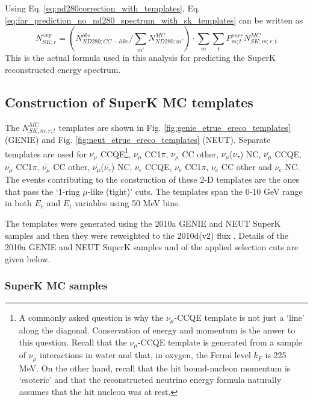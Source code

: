 Using Eq. \ref{eq:nd280correction_with_templates}, 
Eq. \ref{eq:far_prediction_no_nd280_spectrum_with_sk_templates} can be written as
\begin{equation}
\displaystyle
  N_{SK;r}^{exp} = 
    (N^{obs}_{ND280;CC-like} /
     \sum_{m\prime} N^{MC}_{ND280;m\prime})
    \cdot 
    \sum_{m} \sum_{t} 
    	P_{m;t}^{surv}
	N_{SK;m;r;t}^{MC}
\label{eq:far_prediction_no_nd280_spectrum_final}
\end{equation}
This is the actual formula used in this analysis for predicting the 
SuperK reconstructed energy spectrum.

\subsection{Construction of SuperK MC templates}
\label{sk_templates}

The $N_{SK;m;r;t}^{MC}$ templates are shown in Fig. \ref{fig:genie_etrue_ereco_templates} (GENIE) 
and Fig. \ref{fig:neut_etrue_ereco_templates} (NEUT). Separate templates are used for
$\nu_{\mu}$ CCQE\footnote{
  A commonly asked question is why the $\nu_{\mu}$-CCQE template is not just a `line' along
  the diagonal. Conservation of energy and momentum is the anwer to this question.
  Recall that the $\nu_{\mu}$-CCQE template is generated from a sample of $\nu_{\mu}$ interactions
  in water and that, in oxygen, the Fermi level $k_{F}$ is 225 MeV.
  On the other hand, recall that the hit bound-nucleon momentum is `esoteric' 
  and that the reconstructed neutrino energy formula naturally assumes that the hit nucleon was at rest.
}, 
$\nu_{\mu}$ CC1$\pi$, 
$\nu_{\mu}$ CC other, 
$\nu_{\mu}$($\nu_{\tau}$) NC, 
$\bar{\nu_{\mu}}$ CCQE, 
$\bar{\nu_{\mu}}$ CC1$\pi$, 
$\bar{\nu_{\mu}}$ CC other, 
$\bar{\nu_{\mu}}$($\bar{\nu_{\tau}}$) NC, 
$\nu_{e}$ CCQE, 
$\nu_{e}$ CC1$\pi$,
$\nu_{e}$ CC other and 
$\nu_{e}$ NC.
The events contributing to the construction of these 2-D templates are the ones that
pass the `1-ring $\mu$-like (tight)' cuts. The templates span the 0-10 GeV range in
both $E_{r}$ and $E_{t}$ variables using 50 MeV bins.

The templates were generated using the 2010a GENIE and NEUT SuperK samples and
then they were reweighted to the 2010d(v2) flux \cite{BeamWeights10dv2}.
Details of the 2010a GENIE and NEUT SuperK samples and of the applied selection cuts are given below.

\subsubsection*{SuperK MC samples}

